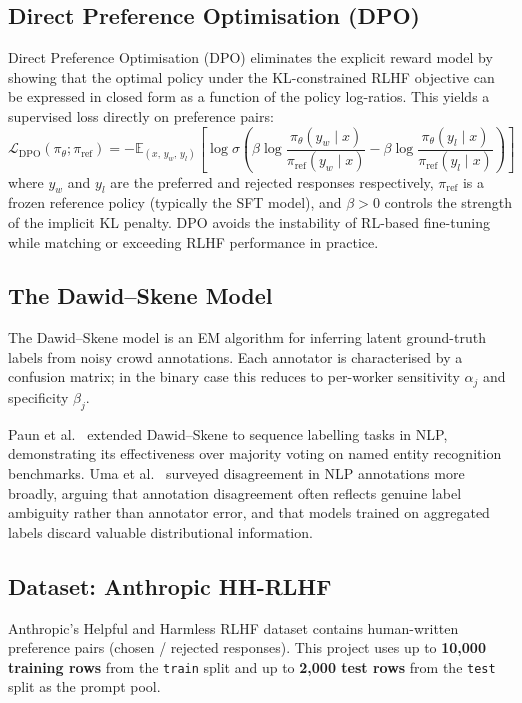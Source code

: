 \documentclass[11pt, a4paper]{article}
\begin{document}
\subsection{Direct Preference Optimisation (DPO)}

Direct Preference Optimisation (DPO) \cite{rafailov2023} eliminates the explicit reward
model by showing that the optimal policy under the KL-constrained RLHF objective can be
expressed in closed form as a function of the policy log-ratios. This yields a supervised
loss directly on preference pairs:
\[
  \mathcal{L}_\text{DPO}(\pi_\theta;\pi_\text{ref}) =
    -\mathbb{E}_{(x,\,y_w,\,y_l)}\!\left[
      \log\sigma\!\left(
        \beta\log\frac{\pi_\theta(y_w\mid x)}{\pi_\text{ref}(y_w\mid x)}
       -\beta\log\frac{\pi_\theta(y_l\mid x)}{\pi_\text{ref}(y_l\mid x)}
      \right)\right]
\]
where $y_w$ and $y_l$ are the preferred and rejected responses respectively,
$\pi_\text{ref}$ is a frozen reference policy (typically the SFT model), and $\beta>0$
controls the strength of the implicit KL penalty. DPO avoids the instability of RL-based
fine-tuning while matching or exceeding RLHF performance in practice.

\subsection{The Dawid--Skene Model}

The Dawid--Skene model \cite{dawid1979} is an EM algorithm for inferring latent
ground-truth labels from noisy crowd annotations. Each annotator is characterised by a
confusion matrix; in the binary case this reduces to per-worker sensitivity $\alpha_j$
and specificity $\beta_j$.

Paun et al.\ \cite{paun2018} extended Dawid--Skene to sequence labelling tasks in NLP,
demonstrating its effectiveness over majority voting on named entity recognition benchmarks.
Uma et al.\ \cite{uma2021} surveyed disagreement in NLP annotations more broadly, arguing
that annotation disagreement often reflects genuine label ambiguity rather than annotator
error, and that models trained on aggregated labels discard valuable distributional
information.

\subsection{Dataset: Anthropic HH-RLHF}

Anthropic's Helpful and Harmless RLHF dataset \cite{bai2022} contains human-written
preference pairs (chosen / rejected responses). This project uses up to \textbf{10,000
training rows} from the \texttt{train} split and up to \textbf{2,000 test rows} from the
\texttt{test} split as the prompt pool.
\end{document}
